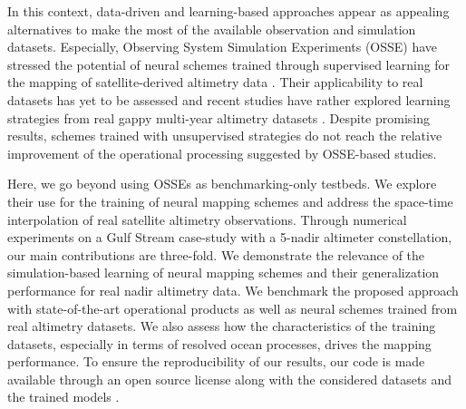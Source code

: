 \begin{bibunit}
  In this context, data-driven and learning-based approaches \cite{alveraazcarateReconstructionIncompleteOceanographic2005,barthDINCAEMultivariateConvolutional2022,lguensatAnalogDataAssimilation2017,fabletENDTOENDPHYSICSINFORMEDREPRESENTATION2021,martinSynthesizingSeaSurface2023} appear as appealing alternatives to make the most of the available observation and simulation datasets. Especially, Observing System Simulation Experiments (OSSE) have stressed the potential of neural schemes trained through supervised learning for the mapping of satellite-derived altimetry data \cite{fabletENDTOENDPHYSICSINFORMEDREPRESENTATION2021,beauchamp4DVarNetSSHEndtoendLearning2023}. 
  Their applicability to real datasets has yet to be assessed and recent studies have rather explored learning strategies from real gappy multi-year altimetry datasets \cite{martinSynthesizingSeaSurface2023}. Despite promising results, schemes trained with unsupervised strategies do not reach the relative improvement of the operational processing suggested by OSSE-based studies.
  
Here, we go beyond using OSSEs as benchmarking-only testbeds. We explore their use for the training of neural mapping schemes and address the space-time interpolation of real satellite altimetry observations. Through numerical experiments on a Gulf Stream case-study with a 5-nadir altimeter constellation, our main contributions are three-fold. We demonstrate the relevance of the simulation-based learning of neural mapping schemes and their generalization performance for real nadir altimetry data. We benchmark the proposed approach with state-of-the-art operational products as well as neural schemes trained from real altimetry datasets. We also assess how the characteristics of the training datasets, especially in terms of resolved ocean processes, drives the mapping performance.
To ensure the reproducibility of our results, our code is made available through an open source license along with the considered datasets and the trained models \cite{febvreCodeDataRelease2023a}.




\end{bibunit}
